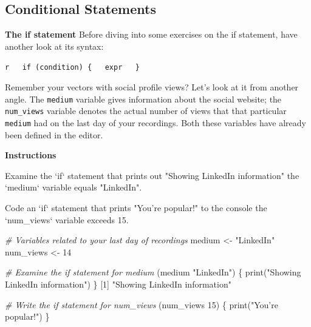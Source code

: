 \documentclass[]{article}
\newcommand{\hlnum}[1]{\textcolor[rgb]{0.816,0.125,0.439}{#1}}%
\newcommand{\hlstr}[1]{\textcolor[rgb]{0.251,0.627,0.251}{#1}}%
\newcommand{\hlcom}[1]{\textcolor[rgb]{0.502,0.502,0.502}{\textit{#1}}}%
\newcommand{\hlstd}[1]{\textcolor[rgb]{0.251,0.251,0.251}{#1}}%
\newcommand{\hlkwc}[1]{\textcolor[rgb]{0.251,0.251,0.251}{#1}}%
\newcommand{\hlkwd}[1]{\textcolor[rgb]{0.878,0.439,0.125}{#1}}%
\newenvironment{Shaded}{\begin{myshaded}}{\end{myshaded}}
\newcommand{\KeywordTok}[1]{\hlkwd{#1}}
\newcommand{\DataTypeTok}[1]{\hlkwc{#1}}
\newcommand{\DecValTok}[1]{\hlnum{#1}}
\newcommand{\StringTok}[1]{\hlstr{#1}}
\newcommand{\CommentTok}[1]{\hlcom{#1}}
\newcommand{\NormalTok}[1]{\hlstd{#1}}
\begin{document}
\subsection{Conditional Statements}\label{conditional-statements}

\textbf{The if statement} Before diving into some exercises on the if
statement, have another look at its syntax:

\texttt{r\ \ \ if\ (condition)\ \{\ \ \ expr\ \ \ \}}

Remember your vectors with social profile views? Let's look at it from
another angle. The \texttt{medium} variable gives information about the
social website; the \texttt{num\_views} variable denotes the actual
number of views that that particular \texttt{medium} had on the last day
of your recordings. Both these variables have already been defined in
the editor.

\textbf{Instructions}

\begin{Shaded}
\begin{Highlighting}[]
\OperatorTok{*}\StringTok{ }\NormalTok{Examine the }\StringTok{`}\DataTypeTok{if}\StringTok{`}\NormalTok{ statement that prints out }\StringTok{"Showing LinkedIn information"} \NormalTok{ the }\StringTok{`}\DataTypeTok{medium}\StringTok{`}\NormalTok{ variable equals }\StringTok{"LinkedIn"}\NormalTok{.}

\OperatorTok{*}\StringTok{ }\NormalTok{Code an }\StringTok{`}\DataTypeTok{if}\StringTok{`}\NormalTok{ statement that prints }\StringTok{"You're popular!"}\NormalTok{ to the console }\NormalTok{ the }\StringTok{`}\DataTypeTok{num_views}\StringTok{`}\NormalTok{ variable exceeds }\DecValTok{15}\NormalTok{.}
\end{Highlighting}
\end{Shaded}

\begin{Shaded}
\begin{Highlighting}[]
\CommentTok{# Variables related to your last day of recordings}
\NormalTok{medium <-}\StringTok{ "LinkedIn"}
\NormalTok{num_views <-}\StringTok{ }\DecValTok{14}

\CommentTok{# Examine the if statement for medium}
\NormalTok{ (medium }\OperatorTok{==}\StringTok{ "LinkedIn"}\NormalTok{) \{}
\KeywordTok{print}\NormalTok{(}\StringTok{"Showing LinkedIn information"}\NormalTok{)}
\NormalTok{\}}
\NormalTok{   [}\DecValTok{1}\NormalTok{] }\StringTok{"Showing LinkedIn information"}

\CommentTok{# Write the if statement for num_views}
\NormalTok{ (num_views }\OperatorTok{>}\StringTok{ }\DecValTok{15}\NormalTok{) \{}
\KeywordTok{print}\NormalTok{(}\StringTok{"You're popular!"}\NormalTok{)}
\NormalTok{\}}
\end{Highlighting}
\end{Shaded}
\end{document}
